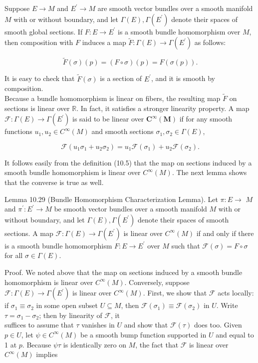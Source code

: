 \documentclass[10pt, letterpaper]{article}
\begin{document}
Suppose $E \rightarrow M$ and $E^{\prime} \rightarrow M$ are smooth vector bundles over a smooth manifold $M$ with or without boundary, and let $\Gamma(E), \Gamma\left(E^{\prime}\right)$ denote their spaces of smooth global sections. If $F: E \rightarrow E^{\prime}$ is a smooth bundle homomorphism over $M$, then composition with $F$ induces a map $\widetilde{F}: \Gamma(E) \rightarrow \Gamma\left(E^{\prime}\right)$ as follows:

$$
\tilde{F}(\sigma)(p)=(F \circ \sigma)(p)=F(\sigma(p)) .
$$

It is easy to check that $\widetilde{F}(\sigma)$ is a section of $E^{\prime}$, and it is smooth by composition.\\
Because a bundle homomorphism is linear on fibers, the resulting map $\widetilde{F}$ on sections is linear over $\mathbb{R}$. In fact, it satisfies a stronger linearity property. A map $\mathcal{F}: \Gamma(E) \rightarrow \Gamma\left(E^{\prime}\right)$ is said to be linear over $\boldsymbol{C}^{\infty}(\boldsymbol{M})$ if for any smooth functions $u_{1}, u_{2} \in C^{\infty}(M)$ and smooth sections $\sigma_{1}, \sigma_{2} \in \Gamma(E)$,

$$
\mathscr{F}\left(u_{1} \sigma_{1}+u_{2} \sigma_{2}\right)=u_{1} \mathscr{F}\left(\sigma_{1}\right)+u_{2} \mathscr{F}\left(\sigma_{2}\right) .
$$

It follows easily from the definition (10.5) that the map on sections induced by a smooth bundle homomorphism is linear over $C^{\infty}(M)$. The next lemma shows that the converse is true as well.

Lemma 10.29 (Bundle Homomorphism Characterization Lemma). Let $\pi: E \rightarrow$ $M$ and $\pi^{\prime}: E^{\prime} \rightarrow M$ be smooth vector bundles over a smooth manifold $M$ with or without boundary, and let $\Gamma(E), \Gamma\left(E^{\prime}\right)$ denote their spaces of smooth sections. A map $\mathscr{F}: \Gamma(E) \rightarrow \Gamma\left(E^{\prime}\right)$ is linear over $C^{\infty}(M)$ if and only if there is a smooth bundle homomorphism $F: E \rightarrow E^{\prime}$ over $M$ such that $\mathcal{F}(\sigma)=F \circ \sigma$ for all $\sigma \in \Gamma(E)$.

Proof. We noted above that the map on sections induced by a smooth bundle homomorphism is linear over $C^{\infty}(M)$. Conversely, suppose $\mathcal{F}: \Gamma(E) \rightarrow \Gamma\left(E^{\prime}\right)$ is linear over $C^{\infty}(M)$. First, we show that $\mathcal{F}$ acts locally: if $\sigma_{1} \equiv \sigma_{2}$ in some open subset $U \subseteq M$, then $\mathscr{F}\left(\sigma_{1}\right) \equiv \mathscr{F}\left(\sigma_{2}\right)$ in $U$. Write $\tau=\sigma_{1}-\sigma_{2}$; then by linearity of $\mathscr{F}$, it\\
suffices to assume that $\tau$ vanishes in $U$ and show that $\mathscr{F}(\tau)$ does too. Given $p \in U$, let $\psi \in C^{\infty}(M)$ be a smooth bump function supported in $U$ and equal to 1 at $p$. Because $\psi \tau$ is identically zero on $M$, the fact that $\mathscr{F}$ is linear over $C^{\infty}(M)$ implies
\end{document}
